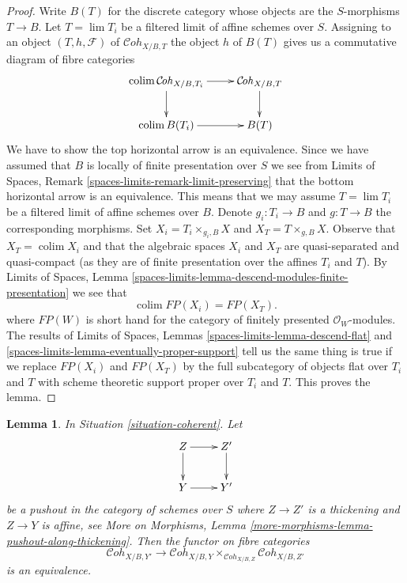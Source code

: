 \documentclass{stacks-project}
\theoremstyle{plain}
\newtheorem{lemma}[subsection]{Lemma}
\theoremstyle{definition}
\theoremstyle{remark}
\numberwithin{equation}{subsection}
\def\lim{\mathop{\mathrm{lim}}\nolimits}
\def\colim{\mathop{\mathrm{colim}}\nolimits}
\def\Cohstack{\mathcal{C}\!\mathit{oh}}
\begin{document}
\begin{proof}
Write $B(T)$ for the discrete category whose
objects are the $S$-morphisms $T \to B$. Let $T = \lim T_i$ be a filtered
limit of affine schemes over $S$. Assigning to an object
$(T, h, \mathcal{F})$ of $\Cohstack_{X/B, T}$ the object $h$
of $B(T)$ gives us a commutative diagram of fibre categories
$$
\xymatrix{
\colim \Cohstack_{X/B, T_i} \ar[r] \ar[d] &
\Cohstack_{X/B, T} \ar[d] \\
\colim B(T_i) \ar[r] & B(T)
}
$$
We have to show the top horizontal arrow is an equivalence. Since
we have assumed that $B$ is locally of finite presentation over $S$
we see from
Limits of Spaces, Remark \ref{spaces-limits-remark-limit-preserving}
that the bottom horizontal arrow is an equivalence. This means that
we may assume $T = \lim T_i$ be a filtered limit of affine schemes over
$B$. Denote $g_i : T_i \to B$ and $g : T \to B$ the corresponding
morphisms. Set $X_i = T_i \times_{g_i, B} X$ and $X_T = T \times_{g, B} X$.
Observe that $X_T = \colim X_i$ and that the algebraic spaces
$X_i$ and $X_T$ are quasi-separated and quasi-compact (as they
are of finite presentation over the affines $T_i$ and $T$).
By Limits of Spaces, Lemma
\ref{spaces-limits-lemma-descend-modules-finite-presentation}
we see that
$$
\colim \textit{FP}(X_i) = \textit{FP}(X_T).
$$
where $\textit{FP}(W)$ is short hand for the category of finitely
presented $\mathcal{O}_W$-modules. The results of
Limits of Spaces, Lemmas \ref{spaces-limits-lemma-descend-flat} and
\ref{spaces-limits-lemma-eventually-proper-support}
tell us the same thing is true if we replace $\textit{FP}(X_i)$
and $\textit{FP}(X_T)$ by the full subcategory of objects
flat over $T_i$ and $T$ with scheme theoretic support proper
over $T_i$ and $T$. This proves the lemma.
\end{proof}

\begin{lemma}
\label{lemma-coherent-RS-star}
In Situation \ref{situation-coherent}. Let
$$
\xymatrix{
Z \ar[r] \ar[d] & Z' \ar[d] \\
Y \ar[r] & Y'
}
$$
be a pushout in the category of schemes over $S$ where
$Z \to Z'$ is a thickening and $Z \to Y$ is affine, see
More on Morphisms, Lemma \ref{more-morphisms-lemma-pushout-along-thickening}.
Then the functor on fibre categories
$$
\Cohstack_{X/B, Y'}
\longrightarrow
\Cohstack_{X/B, Y} \times_{\Cohstack_{X/B, Z}} \Cohstack_{X/B, Z'}
$$
is an equivalence.
\end{lemma}
\end{document}
